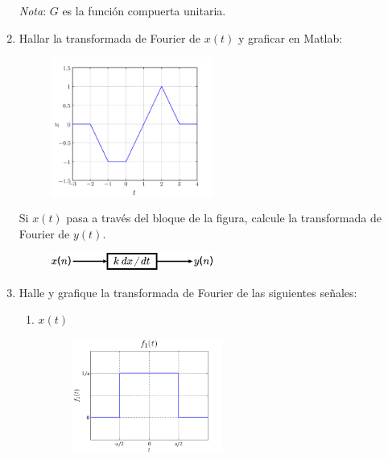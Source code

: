 \documentclass[a4paper,11pt,final]{article}
\begin{document}
\begin{enumerate}
      \noindent \emph{Nota}: $G$ es la función compuerta unitaria.

    \item Hallar la transformada de Fourier de $x\left(t\right)$ y graficar en Matlab:

      \begin{figure}[H]
        \begin{center}
          \includegraphics[width=0.5\textwidth]{./lab4prob2a.png}
        \end{center}
      \end{figure}\vspace{-1.5em}

      Si $x\left(t\right)$ pasa a través del bloque de la figura,
      calcule la transformada de Fourier de $y\left(t\right)$.

      \begin{figure}[H]
        \begin{center}
          \includegraphics[width=0.5\textwidth]{./lab4prob2b.png}
        \end{center}
      \end{figure}\vspace{-1.5em}

    \item Halle y grafique la transformada de Fourier de las siguientes señales:
      \begin{enumerate}
        \item $x\left(t\right)$

          \begin{figure}[H]
            \begin{center}
              \includegraphics[width=0.5\textwidth]{./lab4prob3a.png}
            \end{center}
          \end{figure}\vspace{-1.5em}


\end{enumerate}
\end{enumerate}
\end{document}
